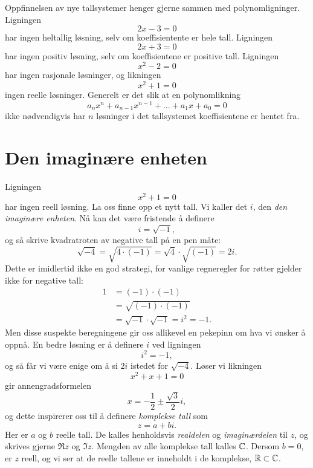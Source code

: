 

\label{ch:komplekse-tall}

Oppfinnelsen av nye tallsystemer henger gjerne sammen med polynomligninger. Ligningen
\[
2x-3=0
\]
har ingen heltallig løsning, selv om koeffisientente er hele tall. Ligningen 
\[
2x+3=0
\]
har ingen positiv løsning, selv om koeffisientene er positive tall. Ligningen
\[
x^2-2=0
\]
har ingen rasjonale løsninger, og likningen 
\[
x^2+1=0
\]
ingen reelle løsninger. 
Generelt er det slik at en polynomlikning
\[
a_nx^n+a_{n-1}x^{n-1}+...+a_1x+a_0=0
\]
ikke nødvendigvis har $n$ løsninger i det tallsystemet koeffisientene er hentet fra. 

\section*{Den imaginære enheten}
Ligningen
\[
x^2+1=0
\]
har ingen reell løsning. 
La oss finne opp et nytt tall. Vi kaller det $i$, den \emph{den imaginære enheten}. 
Nå kan det være fristende å definere
\[
i=\sqrt{-1},
\]
og så skrive kvadratroten av negative tall på en pen måte:
\begin{equation*}
\sqrt{-4}=\sqrt{4\cdot (-1)}=\sqrt{4}\cdot \sqrt{(-1)}=2i.
\end{equation*}
Dette er imidlertid ikke en god strategi,
for vanlige regneregler for røtter gjelder ikke for negative tall:
\begin{align*}
1&=(-1)\cdot(-1)\\&=\sqrt{(-1)\cdot (-1)}\\&=\sqrt{-1}\cdot \sqrt{ -1}=i^2=-1.
\end{align*}
Men disse suspekte beregningene gir oss allikevel en pekepinn om hva vi ønsker å oppnå. 
En bedre løsning er å definere $i$ ved ligningen
\[
i^2=-1,
\]
og så får vi være enige om å si $2i$ istedet for $\sqrt{-4}$.
Løser vi likningen
\[
x^2+x+1=0
\]
gir annengradsformelen
\[
x=-\frac{1}{2}\pm\frac{\sqrt{3}}{2}i,
\]
og dette inspirerer oss til å definere \emph{komplekse tall} som 
\[
z=a+bi.
\]
Her er $a$ og $b$ reelle tall. 
De kalles henholdsvis \emph{realdelen} og \emph{imaginærdelen} til $z$,
og skrives gjerne $\Re z$ og $\Im z$. 
Mengden av alle komplekse tall kalles $\mathbb{C}$. 
Dersom $b=0$, er $z$ reell, og vi ser at de reelle tallene er inneholdt i de komplekse, $\mathbb{R} \subset \mathbb{C}$.


